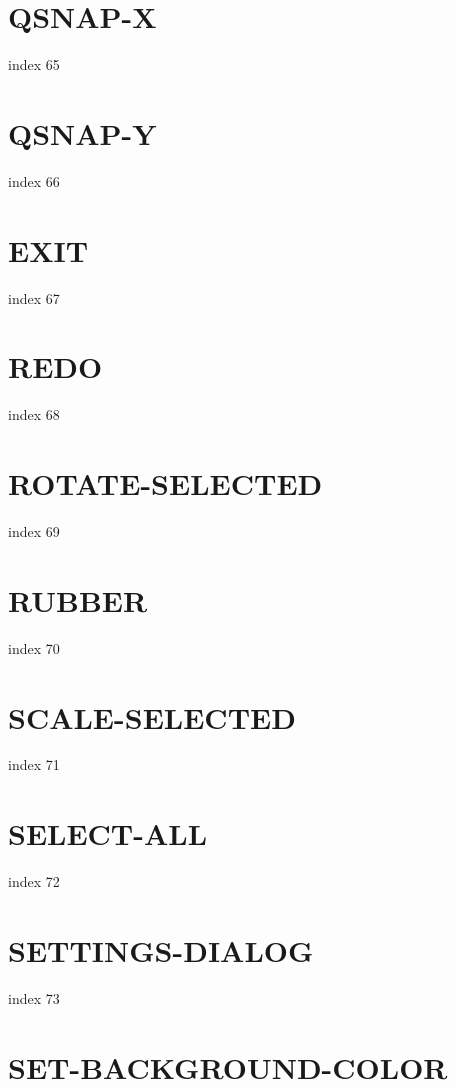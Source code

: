 \documentclass[10pt]{report}
\begin{document}
\section{QSNAP-X}

index 65

\section{QSNAP-Y}

index 66

\section{EXIT}

 index 67

\section{REDO}

index 68

\section{ROTATE-SELECTED}

index 69

\section{RUBBER}

index 70

\section{SCALE-SELECTED}

index 71

\section{SELECT-ALL}

index 72

\section{SETTINGS-DIALOG}

index 73

\section{SET-BACKGROUND-COLOR}
\end{document}
